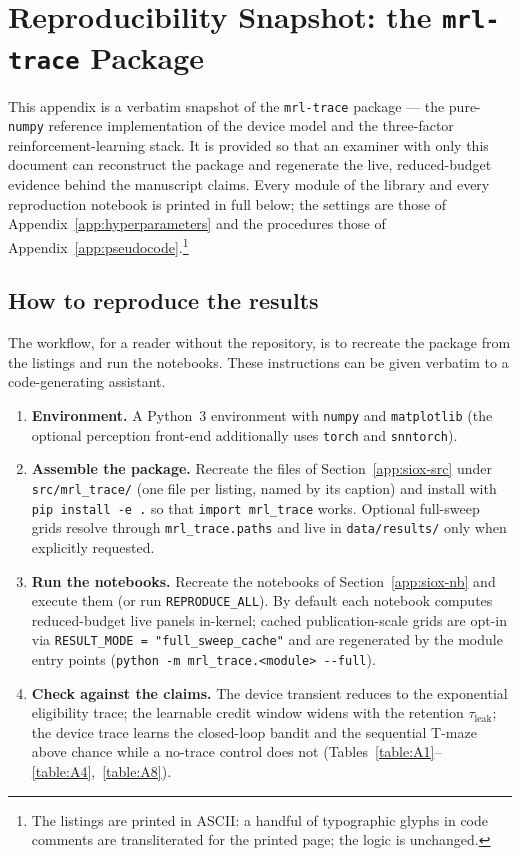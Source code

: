 \chapter{Reproducibility Snapshot: the \texttt{mrl-trace} Package}
\label{app:code-nn}

\noindent This appendix is a verbatim snapshot of the
\texttt{mrl-trace} package --- the pure-\texttt{numpy} reference
implementation of the device model and the three-factor reinforcement-learning stack. It is
provided so that an examiner with only this document can reconstruct the package and
regenerate the live, reduced-budget evidence behind the manuscript claims. Every module of the library and every
reproduction notebook is printed in full below; the settings are those of
Appendix~\ref{app:hyperparameters} and the procedures those of
Appendix~\ref{app:pseudocode}.\footnote{The listings are printed in ASCII: a handful of
typographic glyphs in code comments are transliterated for the printed page; the logic is
unchanged.}

\section{How to reproduce the results}
\label{app:siox-howto}

\noindent The workflow, for a reader without the repository, is to recreate the package
from the listings and run the notebooks. These instructions can be given verbatim to a
code-generating assistant.

\begin{enumerate}
  \item \textbf{Environment.} A Python~3 environment with \texttt{numpy} and
    \texttt{matplotlib} (the optional perception front-end additionally uses
    \texttt{torch} and \texttt{snntorch}).
  \item \textbf{Assemble the package.} Recreate the files of
    Section~\ref{app:siox-src} under \texttt{src/mrl\_trace/} (one file per listing,
    named by its caption) and install with \texttt{pip install -e .} so that
    \texttt{import mrl\_trace} works. Optional full-sweep grids resolve through
    \texttt{mrl\_trace.paths} and live in \texttt{data/results/} only when explicitly requested.
  \item \textbf{Run the notebooks.} Recreate the notebooks of Section~\ref{app:siox-nb}
    and execute them (or run \texttt{REPRODUCE\_ALL}). By default each notebook computes
    reduced-budget live panels in-kernel; cached publication-scale grids are opt-in via
    \texttt{RESULT\_MODE = "full\_sweep\_cache"} and are regenerated by the module entry
    points (\texttt{python -m mrl\_trace.<module> -{}-full}).
  \item \textbf{Check against the claims.} The device transient reduces to the exponential
    eligibility trace; the learnable credit window widens with the retention
    $\tau_{\mathrm{leak}}$; the device trace learns the closed-loop bandit and the
    sequential T-maze above chance while a no-trace control does not
    (Tables~\ref{table:A1}--\ref{table:A4},~\ref{table:A8}).
\end{enumerate}

